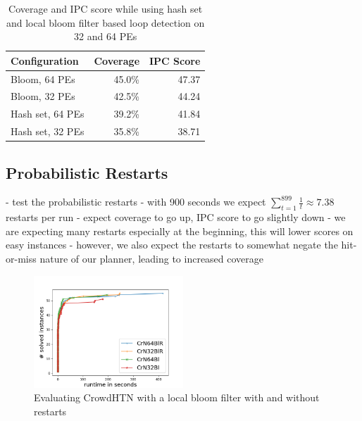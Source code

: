 \begin{table}
	\caption{Coverage and IPC score while using hash set and local bloom filter based loop detection on 32 and 64 PEs}
	\label{table: eval loop detection}
	\centering
	\begin{tabular}{| l | r | r |}
		\hline
		Configuration & Coverage & IPC Score \\
		\hline
		Bloom, 64 PEs		& 45.0\%	& 47.37 \\ %
		Bloom, 32 PEs		& 42.5\%	& 44.24 \\ %
		Hash set, 64 PEs	& 39.2\%	& 41.84 \\ %
		Hash set, 32 PEs	& 35.8\%	& 38.71 \\ %
		\hline
	\end{tabular}
\end{table}

\subsection{Probabilistic Restarts}
\label{eval: restarts}
- test the probabilistic restarts
- with 900 seconds we expect $\sum_{t=1}^{899} \frac{1}{t} \approx 7.38$ restarts per run
- expect coverage to go up, IPC score to go slightly down
- we are expecting many restarts especially at the beginning, this will lower scores on easy instances
- however, we also expect the restarts to somewhat negate the hit-or-miss nature of our planner, leading to increased coverage

\begin{figure}
	\caption{Evaluating CrowdHTN with a local bloom filter with and without restarts}
	\label{figure: restarts}
	\centering
	\includegraphics[width=0.5\textwidth]{images/final/restarts}
\end{figure}
\todo{}

